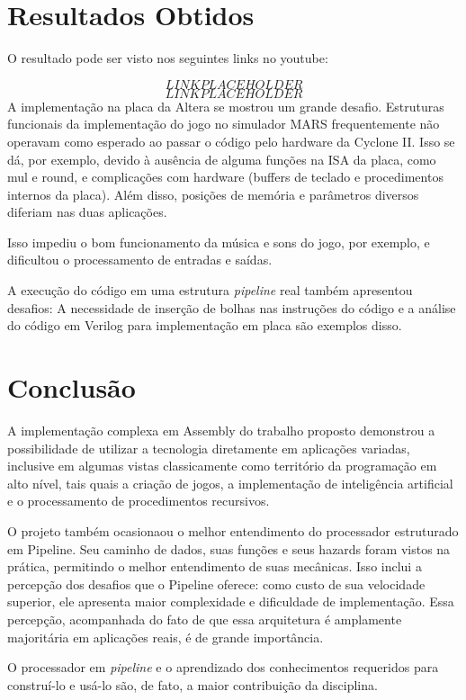 \documentclass[12pt, a4paper, twocolumn]{article}
\begin{document}
\section{Resultados Obtidos}
O resultado pode ser visto nos seguintes links no youtube:

$$LINK PLACEHOLDER$$
$$ LINK PLACEHOLDER $$
A implementação na placa da Altera se mostrou um grande desafio. Estruturas funcionais da implementação do jogo no simulador MARS frequentemente não operavam como esperado ao passar o código pelo hardware da Cyclone II. Isso se dá, por exemplo, devido à ausência de alguma funções na ISA da placa, como mul e round, e complicações com hardware (buffers de teclado e procedimentos internos da placa). Além disso, posições de memória e parâmetros diversos diferiam nas duas aplicações.

Isso impediu o bom funcionamento da música e sons do jogo, por exemplo, e dificultou o processamento de entradas e saídas.

A execução do código em uma estrutura \textit{pipeline} real também apresentou desafios: A necessidade de inserção de bolhas nas instruções do código e a análise do código em Verilog para implementação em placa são exemplos disso.


\section{Conclusão}

A implementação complexa em Assembly do trabalho proposto demonstrou a possibilidade de utilizar a tecnologia diretamente em aplicações variadas, inclusive em algumas vistas classicamente como território da programação em alto nível, tais quais a criação de jogos, a implementação de inteligência artificial e o processamento de procedimentos recursivos.

O projeto também ocasionaou o melhor entendimento do processador estruturado em Pipeline. Seu caminho de dados, suas funções e seus hazards foram vistos na prática, permitindo o melhor entendimento de suas mecânicas. Isso inclui a percepção dos desafios que o Pipeline oferece: como custo de sua velocidade superior, ele apresenta maior complexidade e dificuldade de implementação. Essa percepção, acompanhada do fato de que essa arquitetura é amplamente majoritária em aplicações reais, é de grande importância.

O processador em \textit{pipeline} e o aprendizado dos conhecimentos requeridos para construí-lo e usá-lo são, de fato, a maior contribuição da disciplina.
\end{document}
